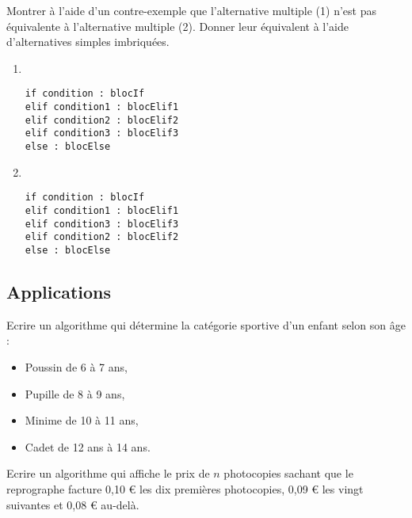 \begin{question}
Montrer à l'aide d'un contre-exemple que l'alternative multiple (1)
n'est pas équivalente à l'alternative multiple (2).
Donner leur équivalent à l'aide d'alternatives simples imbriquées.


\noindent\begin{minipage}[t]{6cm}\footnotesize
\begin{enumerate}
\item \tt
\begin{Verbatim}
if condition : blocIf
elif condition1 : blocElif1
elif condition2 : blocElif2
elif condition3 : blocElif3
else : blocElse
\end{Verbatim}
\end{enumerate}
\end{minipage}
\hfill
\begin{minipage}[t]{6cm}\footnotesize
\begin{enumerate}\setcounter{enumi}{1}
\item \tt
\begin{Verbatim}
if condition : blocIf
elif condition1 : blocElif1
elif condition3 : blocElif3
elif condition2 : blocElif2
else : blocElse
\end{Verbatim}
\end{enumerate}
\end{minipage}


\end{question}
\subsection{Applications}

\begin{question}
Ecrire un algorithme qui détermine la catégorie sportive d'un enfant selon
son âge : 
\begin{itemize}
\item Poussin de 6 à 7 ans,
\item Pupille de 8 à 9 ans,
\item Minime de 10 à 11 ans,
\item Cadet de 12 ans à 14 ans.
\end{itemize}
\end{question}


\begin{question}
Ecrire un algorithme qui affiche le prix de $n$ photocopies sachant que
le reprographe facture 0,10 \euro{} les dix premières photocopies, 0,09 \euro{} 
	les vingt suivantes et 0,08 \euro{} au-delà.
\end{question}

